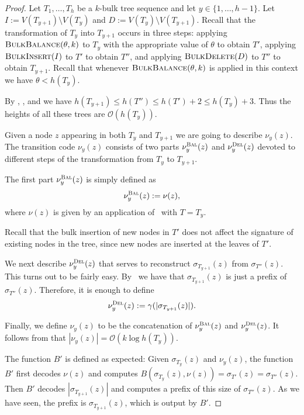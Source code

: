 \documentclass[kpfonts]{patmorin}
\newcommand{\Oh}{\mathcal{O}}
\let\leq\leqslant
\begin{document}
\begin{proof}
  Let $T_1,\dots,T_h$ be a $k$-bulk tree sequence and let $y\in\{1,\dots,h-1\}$. Let $I := V(T_{y+1})\setminus V(T_y)$ and $D := V(T_y) \setminus V(T_{y+1})$.
  Recall that the transformation of $T_{y}$ into $T_{y+1}$ occurs in three steps:
  applying $\textsc{BulkBalance}(\theta,k)$ to $T_y$ with the appropriate value of $\theta$ to obtain $T'$,
  applying $\textsc{BulkInsert}(I)$ to $T'$ to obtain $T''$, and
  applying $\textsc{BulkDelete}(D)$ to $T''$ to obtain $T_{y+1}$.
  Recall that whenever $\textsc{BulkBalance}(\theta,k)$ is applied in this context we have $\theta < h(T_y)$.

  By , , and  we have  $h(T_{y+1}) \leq h(T'') \leq h(T')+2 \leq h(T_y)+3$.
  Thus the heights of all these trees are $\Oh(h(T_y))$.


  Given a node $z$ appearing in both $T_y$ and $T_{y+1}$ we are going to describe $\nu_y(z)$.
  The transition code $\nu_y(z)$ consists of two parts $\nu_y^{\textsc{Bal}}(z)$ and $\nu_y^{\textsc{Del}}(z)$ devoted to different steps of the transformation from $T_y$ to $T_{y+1}$.

  The first part $\nu_y^{\textsc{Bal}}(z)$ is simply defined as
  \[
  \nu_y^{\textsc{Bal}}(z) := \nu(z),
  \] 
  where $\nu(z)$ is given by an application of~ with $T=T_y$.

  Recall that the bulk insertion of new nodes in $T'$ does not affect the signature of existing nodes in the tree, since new nodes are inserted at the leaves of $T'$. 

  We next describe $\nu^{\textsc{Del}}_y(z)$ that serves to reconstruct $\sigma_{T_{y+1}}(z)$ from $\sigma_{T''}(z)$.
  This turns out to be fairly easy.
  By~ we have that $\sigma_{T_{y+1}}(z)$ is just a prefix of $\sigma_{T''}(z)$.
  Therefore, it is enough to define
  \[
  \nu^{\textsc{Del}}_y(z):= \gamma(|\sigma_{T_{y+1}}(z)|).
  \]

  Finally, we define $\nu_y(z)$ to be the concatenation of $\nu^{\textsc{Bal}}_y(z)$ and $\nu^{\textsc{Del}}_y(z)$.
  It follows from that $|\nu_y(z)| = \Oh(k\log h(T_y))$.

  The function $B'$ is defined as expected:
  Given $\sigma_{T_{y}}(z)$ and $\nu_y(z)$, the function $B'$ first decodes $\nu(z)$ and computes 
  $B(\sigma_{T_{y}}(z),\nu(z))=\sigma_{T'}(z)=\sigma_{T''}(z)$. 
  Then $B'$ decodes $|\sigma_{T_{y+1}}(z)|$ and computes a prefix of this size of $\sigma_{T''}(z)$. 
  As we have seen, the prefix is $\sigma_{T_{y+1}}(z)$, which is output by $B'$.
\end{proof}
\end{document}

